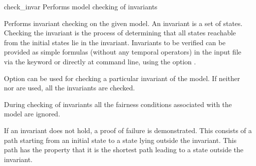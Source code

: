 \begin{nusmvCommand} {check\_invar} {Performs model checking of invariants}
 
 
Performs invariant checking on the given model. An invariant is a set
of states. Checking the invariant is the process of determining that
all states reachable from the initial states lie in the invariant.
Invariants to be verified can be provided as simple formulas (without
any temporal operators) in the input file via the 
keyword or directly at command line, using the option .
   
Option  can be used for checking a particular invariant
of the model. If neither  nor  are used,
all the invariants are checked.
  
During checking of invariants all the fairness conditions associated
with the model are ignored.
  
If an invariant does not hold, a proof of failure is demonstrated.
This consists of a path starting from an initial state to a state
lying outside the invariant. This path has the property that it is the
shortest path leading to a state outside the invariant.

\begin{cmdOpt}

 
            

\end{cmdOpt}

\end{nusmvCommand}
